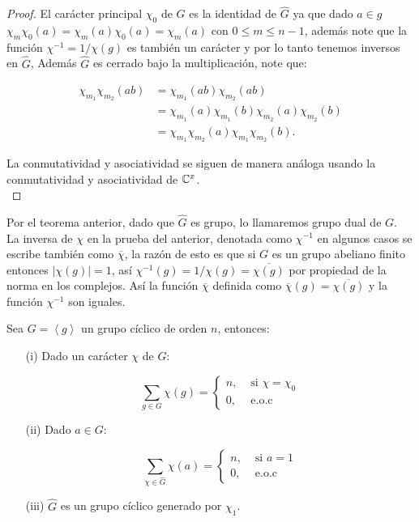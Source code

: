 \begin{proof}
El carácter principal $\chi_0$ de $G$ es la identidad de $\widehat{G}$ ya que dado $a\in g$ $\chi_m\chi_0(a)=\chi_m(a)\chi_0(a)=\chi_m(a)$ con $0\leq m\leq n-1$, además note que la función $\chi^{-1}=1/\chi(g)$ es también un carácter y por lo tanto tenemos inversos en $\widehat{G}$, Además $\widehat{G}$ es cerrado bajo la multiplicación, note que:

\begin{align*}
     \chi_{m_1}\chi_{m_2}(ab)&=\chi_{m_1}(ab)\chi_{m_2}(ab)\\
     &=\chi_{m_1}(a)\chi_{m_1}(b)\chi_{m_2}(a)\chi_{m_2}(b)\\
     &=\chi_{m_1}\chi_{m_2}(a)\chi_{m_1}\chi_{m_2}(b)
      .\end{align*}

    La conmutatividad y asociatividad se siguen de manera análoga usando la conmutatividad y asociatividad de $\mathbb{C}^{x}$.\\
\end{proof}


\begin{note}
Por el teorema anterior, dado que $\widehat{G}$ es grupo, lo llamaremos grupo dual de $G$.\\

La inversa de $\chi$ en la prueba del anterior, denotada  como $\chi^{-1}$ en algunos casos se escribe también como $\overline{\chi}$, la razón de esto es que si $G$ es un grupo abeliano finito entonces $|\chi(g)|=1$, así $\chi^{-1}(g)=1/\chi(g)=\overline{\chi(g)}$ por propiedad de la norma en los complejos. Así la función $\overline{\chi}$ definida como $\overline{\chi}(g)=\overline{\chi(g)}$ y la función $\chi^{-1}$ son iguales. \cite{pongsriiam2023analytic}
\end{note}

\begin{theorem}
Sea $G=\left\langle g\right\rangle$ un grupo cíclico de orden $n$, entonces:

\begin{itemize}
\item[(i)] Dado un carácter $\chi$ de $G$:

$$
\sum_{g \in G} \chi(g)= \begin{cases}n, & \text { si } \chi=\chi_0 \\ 0, & \text { e.o.c }\end{cases}
$$

\item[(ii)] Dado $a \in G$:

$$
\sum_{\chi \in \widehat{G}} \chi(a)= \begin{cases}n, & \text { si } a=1 \\ 0, & \text { e.o.c }\end{cases}
$$

\item[(iii)] $\widehat{G}$ es un grupo cíclico generado por $\chi_1$.
\end{itemize}

\end{theorem}


